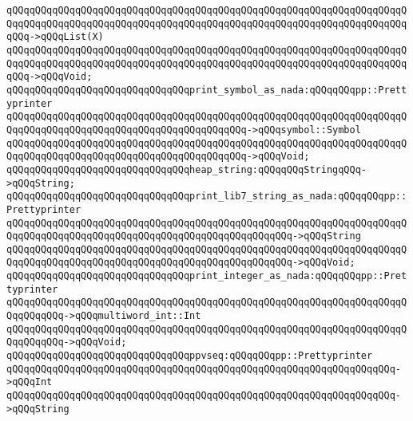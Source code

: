\verb|qQQqqQQqqQQqqQQqqQQqqQQqqQQqqQQqqQQqqQQqqQQqqQQqqQQqqQQqqQQqqQQqqQQqqQQqqQQqqQQqqQQqqQQqqQQqqQQqqQQqqQQqqQQqqQQqqQQqqQQqqQQqqQQqqQQqqQQqqQQqqQQq->qQQqList(X)|\newline
\verb|qQQqqQQqqQQqqQQqqQQqqQQqqQQqqQQqqQQqqQQqqQQqqQQqqQQqqQQqqQQqqQQqqQQqqQQqqQQqqQQqqQQqqQQqqQQqqQQqqQQqqQQqqQQqqQQqqQQqqQQqqQQqqQQqqQQqqQQqqQQqqQQq->qQQqVoid;|\newline
\newline
\verb|qQQqqQQqqQQqqQQqqQQqqQQqqQQqqQQqprint_symbol_as_nada:qQQqqQQqpp::Prettyprinter|\newline
\verb|qQQqqQQqqQQqqQQqqQQqqQQqqQQqqQQqqQQqqQQqqQQqqQQqqQQqqQQqqQQqqQQqqQQqqQQqqQQqqQQqqQQqqQQqqQQqqQQqqQQqqQQqqQQqqQQq->qQQqsymbol::Symbol|\newline
\verb|qQQqqQQqqQQqqQQqqQQqqQQqqQQqqQQqqQQqqQQqqQQqqQQqqQQqqQQqqQQqqQQqqQQqqQQqqQQqqQQqqQQqqQQqqQQqqQQqqQQqqQQqqQQqqQQq->qQQqVoid;|\newline
\newline
\verb|qQQqqQQqqQQqqQQqqQQqqQQqqQQqqQQqheap_string:qQQqqQQqStringqQQq->qQQqString;|\newline
\newline
\verb|qQQqqQQqqQQqqQQqqQQqqQQqqQQqqQQqprint_lib7_string_as_nada:qQQqqQQqpp::Prettyprinter|\newline
\verb|qQQqqQQqqQQqqQQqqQQqqQQqqQQqqQQqqQQqqQQqqQQqqQQqqQQqqQQqqQQqqQQqqQQqqQQqqQQqqQQqqQQqqQQqqQQqqQQqqQQqqQQqqQQqqQQqqQQqqQQq->qQQqString|\newline
\verb|qQQqqQQqqQQqqQQqqQQqqQQqqQQqqQQqqQQqqQQqqQQqqQQqqQQqqQQqqQQqqQQqqQQqqQQqqQQqqQQqqQQqqQQqqQQqqQQqqQQqqQQqqQQqqQQqqQQqqQQq->qQQqVoid;|\newline
\newline
\verb|qQQqqQQqqQQqqQQqqQQqqQQqqQQqqQQqprint_integer_as_nada:qQQqqQQqpp::Prettyprinter|\newline
\verb|qQQqqQQqqQQqqQQqqQQqqQQqqQQqqQQqqQQqqQQqqQQqqQQqqQQqqQQqqQQqqQQqqQQqqQQqqQQqqQQq->qQQqmultiword_int::Int|\newline
\verb|qQQqqQQqqQQqqQQqqQQqqQQqqQQqqQQqqQQqqQQqqQQqqQQqqQQqqQQqqQQqqQQqqQQqqQQqqQQqqQQq->qQQqVoid;|\newline
\newline
\verb|qQQqqQQqqQQqqQQqqQQqqQQqqQQqqQQqppvseq:qQQqqQQqpp::Prettyprinter|\newline
\verb|qQQqqQQqqQQqqQQqqQQqqQQqqQQqqQQqqQQqqQQqqQQqqQQqqQQqqQQqqQQqqQQqqQQq->qQQqInt|\newline
\verb|qQQqqQQqqQQqqQQqqQQqqQQqqQQqqQQqqQQqqQQqqQQqqQQqqQQqqQQqqQQqqQQqqQQq->qQQqString|\newline
